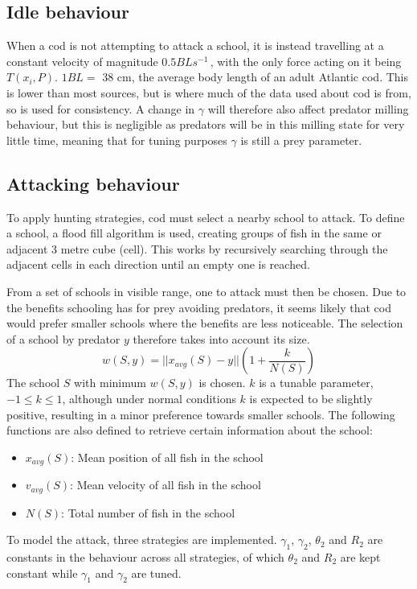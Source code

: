 \documentclass[12pt]{article}
\begin{document}
\subsection{Idle behaviour}
When a cod is not attempting to attack a school, it is instead travelling at a constant velocity of magnitude $0.5BLs^{-1}$\,\supercite{Rillahan2008}, with the only force acting on it being $T(x_i,P)$. $1BL = $ 38 cm, the average body length of an adult Atlantic cod\supercite{Rillahan2008}. This is lower than most sources, but is where much of the data used about cod is from, so is used for consistency. A change in $\gamma$ will therefore also affect predator milling behaviour, but this is negligible as predators will be in this milling state for very little time, meaning that for tuning purposes $\gamma$ is still a prey parameter.
\subsection{Attacking behaviour}
To apply hunting strategies, cod must select a nearby school to attack. To define a school, a flood fill algorithm is used, creating groups of fish in the same or adjacent 3 metre cube (cell). This works by recursively searching through the adjacent cells in each direction until an empty one is reached.\par
From a set of schools in visible range, one to attack must then be chosen. Due to the benefits schooling has for prey avoiding predators\supercite{shaw1978schooling}, it seems likely that cod would prefer smaller schools where the benefits are less noticeable. The selection of a school by predator $y$ therefore takes into account its size.
\begin{equation}
    w(S,y) = ||x_{avg}(S)-y||\left(1+\frac{k}{N(S)}\right)
\end{equation}
The school $S$ with minimum $w(S,y)$ is chosen. $k$ is a tunable parameter, $-1\le k\le 1$, although under normal conditions $k$ is expected to be slightly positive, resulting in a minor preference towards smaller schools. The following functions are also defined to retrieve certain information about the school:
\begin{itemize}
    \item $x_{avg}(S)$: Mean position of all fish in the school
    \item $v_{avg}(S)$: Mean velocity of all fish in the school
    \item $N(S)$: Total number of fish in the school
\end{itemize}
To model the attack, three strategies are implemented. $\gamma_1$, $\gamma_2$, $\theta_2$ and $R_2$ are constants in the behaviour across all strategies, of which $\theta_2$ and $R_2$ are kept constant while $\gamma_1$ and $\gamma_2$ are tuned.
\end{document}
